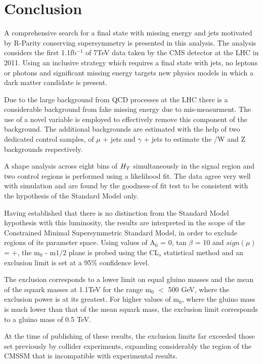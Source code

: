\chapter{Conclusion}
\label{ch:conclusion}

A comprehensive search for a final state with missing energy and jets motivated by R-Parity conserving supersymmetry is presented in this analysis. The analysis considers the first 1.1fb$^{-1}$ of 7TeV data taken by the CMS detector at the LHC in 2011. Using an inclusive strategy which requires a final state with jets, no leptons or photons and significant missing energy targets new physics models in which a dark matter candidate is present. 

Due to the large background from QCD processes at the LHC there is a considerable background from fake missing energy due to mis-measurment. The use of a novel variable \alt is employed to effectively remove this component of the background. The additional backgrounds are estimated with the help of two dedicated control samples, of $\mu$ + jets and $\gamma$ + jets to estimate the \tto/W and Z backgrounds respectively.  


 A shape analysis across eight bins of $H_{T} $ simultaneously in the signal region and two control regions is performed using a likelihood fit. The data agree very well with simulation and are found by the goodness-of fit test to be consistent with the hypothesis of the Standard Model only. 

Having established that there is no distinction from the Standard Model hypothesis with this luminosity, the results are interpreted in the scope of the Constrained Minimal Supersymmetric Standard Model, in order to exclude regions of its parameter space. Using values of A$_{0}$ = 0, tan $\beta$ = 10 and $sign(\mu)$ = +, the m$_{0}$ - m${1/2}$ plane is probed using the CL$_{s}$ statistical method and an exclusion limit is set at a 95\% confidence level. 

The exclusion corresponds to a lower limit on equal gluino masses and the mean of the squark  masses at 1.1TeV for the range m$_{0}$ $<$ 500 GeV, where the exclusion power is at its greatest. For higher values of m$_{0}$, where the gluino mass is much lower than that of the mean squark mass, the exclusion limit corresponds to a gluino mass of 0.5 TeV. 

At the time of publishing of these results, the exclusion limits far exceeded those set previously by collider experiments, expanding considerably the region of the CMSSM that is incompatible with experimental results.  

